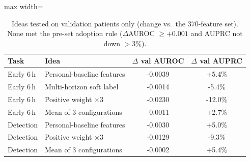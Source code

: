 \begin{table}[!t]
\centering\footnotesize\setlength{\tabcolsep}{3pt}
\caption{Ideas tested on validation patients only (change vs.\ the 370-feature set). None met the pre-set adoption rule ($\Delta$AUROC $\ge +0.001$ and AUPRC not down $>3\%$).}
\label{tab:negative}
\begin{adjustbox}{max width=\linewidth}
\begin{tabular}{llcc}
\toprule
Task & Idea & $\Delta$ val AUROC & $\Delta$ val AUPRC \\
\midrule
Early 6\,h & Personal-baseline features & -0.0039 & +5.4\% \\
Early 6\,h & Multi-horizon soft label & -0.0014 & -5.4\% \\
Early 6\,h & Positive weight $\times$3 & -0.0230 & -12.0\% \\
Early 6\,h & Mean of 3 configurations & -0.0011 & +2.7\% \\
\midrule
Detection & Personal-baseline features & -0.0030 & +5.0\% \\
Detection & Positive weight $\times$3 & -0.0129 & -9.3\% \\
Detection & Mean of 3 configurations & -0.0002 & +5.4\% \\
\bottomrule
\end{tabular}
\end{adjustbox}
\end{table}
